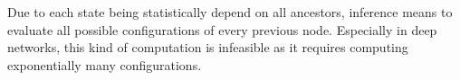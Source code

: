 Due to each state being statistically depend on all ancestors, inference means to evaluate all possible configurations of every previous node.
Especially in deep networks, this kind of computation is infeasible as it requires computing exponentially many configurations.\\






%





\newpage
